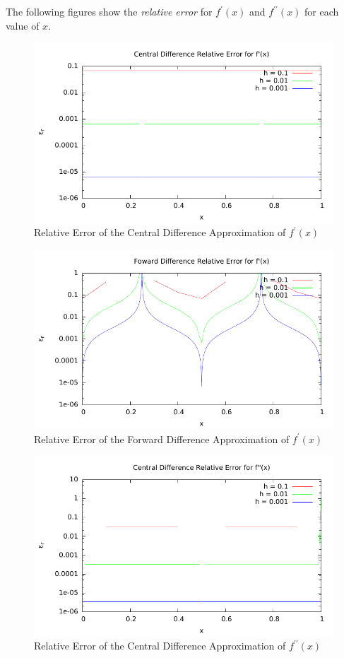 \documentclass[addpoints]{exam}
\begin{document}
\begin{questions}
\begin{solution}
The following figures show the {\em relative error} for $f^{\prime}(x)$ and $f^{\prime \prime}(x)$ for each value of $x$.

\begin{figure}[H]
\centering
\includegraphics{CD_error.pdf}
\caption{Relative Error of the Central Difference Approximation of $f^{\prime}(x)$}
\end{figure}

\begin{figure}[H]
\centering
\includegraphics{FWD_error.pdf}
\caption{Relative Error of the Forward Difference Approximation of $f^{\prime}(x)$}
\end{figure}

\begin{figure}[H]
\centering
\includegraphics{CD2_error.pdf}
\caption{Relative Error of the Central Difference Approximation of $f^{\prime \prime}(x)$}
\end{figure}


\end{solution}
\end{questions}
\end{document}
